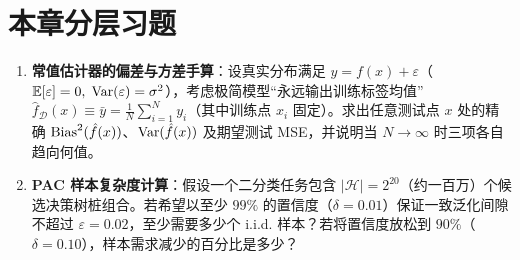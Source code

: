 \section*{本章分层习题}

\begin{enumerate}[label=\textbf{4.3.\arabic*}, leftmargin=3.3em, itemsep=5pt]
  \item\label{ex:4.3.1} \textbf{常值估计器的偏差与方差手算}：设真实分布满足 $y = f(x) + \varepsilon$（$\mathbb{E}[\varepsilon]=0,\; \operatorname{Var}(\varepsilon)=\sigma^2$），考虑极简模型“永远输出训练标签均值” $\hat{f}_{\mathcal{D}}(x) \equiv \bar{y} = \frac{1}{N}\sum_{i=1}^N y_i$（其中训练点 $x_i$ 固定）。求出任意测试点 $x$ 处的精确 $\operatorname{Bias}^2(\hat{f}(x))$、$\operatorname{Var}(\hat{f}(x))$ 及期望测试 MSE，并说明当 $N \to \infty$ 时三项各自趋向何值。

  \item\label{ex:4.3.2} \textbf{PAC 样本复杂度计算}：假设一个二分类任务包含 $|\mathcal{H}| = 2^{20}$（约一百万）个候选决策树桩组合。若希望以至少 $99\%$ 的置信度（$\delta = 0.01$）保证一致泛化间隙不超过 $\varepsilon = 0.02$，至少需要多少个 i.i.d. 样本？若将置信度放松到 $90\%$（$\delta = 0.10$），样本需求减少的百分比是多少？
\end{enumerate}

